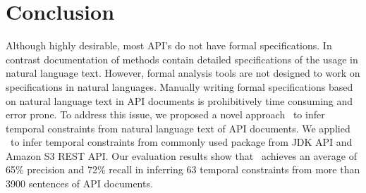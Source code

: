 \section{Conclusion}
\label{sec:conclusion}

Although highly desirable, most API's do not have formal specifications.
In contrast documentation of methods contain detailed specifications of the usage in natural language text.
However, formal analysis tools are not designed to work on specifications in natural languages.
Manually writing formal specifications based on natural language text in API documents is prohibitively time consuming and error prone.
To address this issue, we proposed a novel approach \tool\ to infer temporal constraints from natural language text of API documents.
We applied \tool\ to infer temporal constraints from 
commonly used package  from JDK API and Amazon S3 REST API.
Our evaluation results show that \tool\ achieves an average of 65\% precision and 72\% recall
in inferring 63 temporal constraints from more than 3900 sentences of API documents.
